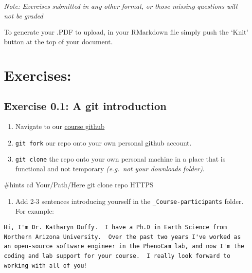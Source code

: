 \documentclass[
  letterpaper,
]{book}
\newenvironment{Shaded}{\begin{snugshade}}{\end{snugshade}}
\newcommand{\BuiltInTok}[1]{\textcolor[rgb]{0.00,0.23,0.31}{#1}}
\newcommand{\CommentTok}[1]{\textcolor[rgb]{0.37,0.37,0.37}{#1}}
\newcommand{\ExtensionTok}[1]{\textcolor[rgb]{0.00,0.23,0.31}{#1}}
\newcommand{\KeywordTok}[1]{\textcolor[rgb]{0.00,0.23,0.31}{\textbf{#1}}}
\newcommand{\NormalTok}[1]{\textcolor[rgb]{0.00,0.23,0.31}{#1}}
\newcommand{\StringTok}[1]{\textcolor[rgb]{0.13,0.47,0.30}{#1}}
\providecommand{\tightlist}{%
  \setlength{\itemsep}{0pt}\setlength{\parskip}{0pt}}
\begin{document}
\emph{Note: Exercises submitted in any other format, or those missing
questions will not be graded}

To generate your .PDF to upload, in your RMarkdown file simply push the
`Knit' button at the top of your document.

\section*{Exercises:}\label{exercises}


\subsection*{Exercise 0.1: A git
introduction}\label{exercise-0.1-a-git-introduction}

\begin{enumerate}
\def\labelenumi{\arabic{enumi}.}
\tightlist
\item
  Navigate to our
  \href{https://github.com/katharynduffy/Environmental-Informatics-Using-Research-Infrastructures-and-their-Data}{course
  github}
\item
  \texttt{git\ fork} our repo onto your own personal github account.
\item
  \texttt{git\ clone} the repo onto your own personal machine in a place
  that is functional and not temporary \emph{(e.g.~not your downloads
  folder)}.
\end{enumerate}

\begin{Shaded}
\begin{Highlighting}[]
    \CommentTok{\#hints}
    \BuiltInTok{cd} \KeywordTok{\textasciigrave{}}\ExtensionTok{Your/Path/Here}\StringTok{\textquotesingle{}}
\StringTok{    git clone \textquotesingle{}}\ExtensionTok{repo}\NormalTok{ HTTPS}\StringTok{\textquotesingle{}}
\end{Highlighting}
\end{Shaded}

\begin{enumerate}
\def\labelenumi{\arabic{enumi}.}
\setcounter{enumi}{3}
\tightlist
\item
  Add 2-3 sentences introducing yourself in the
  \texttt{\_Course-participants} folder. For example:
\end{enumerate}

\begin{verbatim}
Hi, I'm Dr. Katharyn Duffy.  I have a Ph.D in Earth Science from Northern Arizona University.  Over the past two years I've worked as an open-source software engineer in the PhenoCam lab, and now I'm the coding and lab support for your course.  I really look forward to working with all of you!
\end{verbatim}
\end{document}
